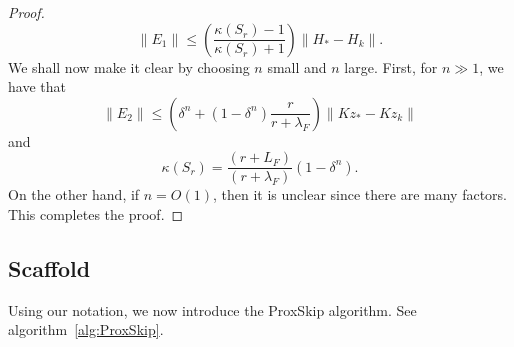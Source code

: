 \begin{itemize}
\begin{proof}
\begin{equation}
\|E_1\| \leq \left ( \frac{\kappa(S_r) - 1}{\kappa(S_r) + 1} \right ) \|H_* - H_k\|. 
\end{equation} 
We shall now make it clear by choosing $n$ small and $n$ large. First, for $n \gg 1$, we have that
\begin{equation}
\|E_2\| \leq \left ( \delta^n + (1 - \delta^n)\frac{r}{r+\lambda_F} \right ) \|Kz_* - Kz_k\| 
\end{equation}
and 
\begin{equation}
\kappa(S_{r}) = \frac{(r+L_F)}{(r+\lambda_F)} (1 - \delta^n).  
\end{equation} 
On the other hand, if $n = O(1)$, then it is unclear since there are many factors. This completes the proof. 
\end{proof} 


 
 
\subsection{Scaffold}
Using our notation, we now introduce the ProxSkip algorithm. See algorithm~\ref{alg:ProxSkip}. 


\end{itemize}
